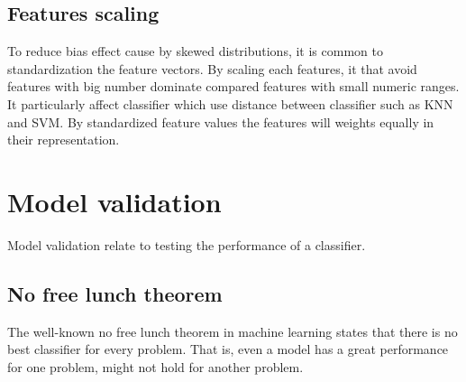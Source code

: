 \documentclass[USenglish]{ifimaster}  %
\begin{document}
\subsection{Features scaling}
\label{subsec:scaling}
To reduce bias effect cause by skewed distributions, it is common to standardization the feature vectors. By scaling each features, it that avoid features with big number dominate compared features with small numeric ranges. It particularly affect classifier which use distance between classifier such as KNN and SVM.  By standardized feature values the features will weights equally in their representation.


\section{Model validation}
Model validation relate to testing the performance of a classifier. 

\subsection{No free lunch theorem} \label{seq:nofree}
The well-known no free lunch theorem\cite{NOFREELUNCH} in machine learning states that there is no best classifier for every problem. That is, even a model has a great performance for one problem, might not hold for another problem. 
\end{document}
